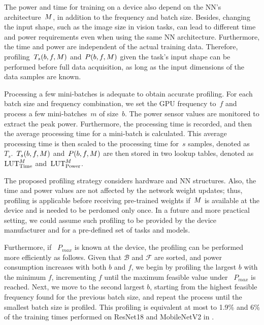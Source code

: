 The power and time for training on a device also depend on the \ac{NN}'s architecture~$M$, in addition to the frequency and batch size. Besides, changing the input shape, such as the image size in vision tasks, can lead to different time and power requirements even when using the same \ac{NN} architecture. Furthermore, the time and power are independent of the actual training data. Therefore, profiling~${T_{s}(b, f, M)}$ and~$P(b, f, M)$ given the task's input shape can be performed before full data acquisition, as long as the input dimensions of the data samples are known. 


Processing a few mini-batches is adequate to obtain accurate profiling. For each batch size and frequency combination, we set the GPU frequency to~$f$ and process a few mini-batches~$m$ of size~$b$. The power sensor values are monitored to extract the peak power. Furthermore, the processing time is recorded, and then the average processing time for a mini-batch is calculated. This average processing time is then scaled to the processing time for~$s$ samples, denoted as~$T_{s}$.~$T_{s}(b, f, M)$ and~$P(b, f, M)$ are then stored in two lookup tables, denoted as~$\text{LUT}^{M}_{\text{Time}}$ and~$\text{LUT}^{M}_{\text{Power}}$.


The proposed profiling strategy considers hardware and \ac{NN} structures. Also, the time and power values are not affected by the network weight updates; thus, profiling is applicable before receiving pre-trained weights if~$M$ is available at the device and is needed to be perdomed only once. In a future and more practical setting, we could assume such profiling to be provided by the device manufacturer and for a pre-defined set of tasks and models.


Furthermore, if ~$P_{max}$ is known at the device, the profiling can be performed more efficiently as follows. Given that $\mathcal{B}$ and $\mathcal{F}$ are sorted, and power consumption increases with both $b$ and $f$, we begin by profiling the largest $b$ with the minimum $f$, incrementing $f$ until the maximum feasible value under ~$P_{max}$ is reached. Next, we move to the second largest $b$, starting from the highest feasible frequency found for the previous batch size, and repeat the process until the smallest batch size is profiled. This profiling is equivalent at most to 1.9\% and 6\% of the training times performed on ResNet18 and MobileNetV2 in .


